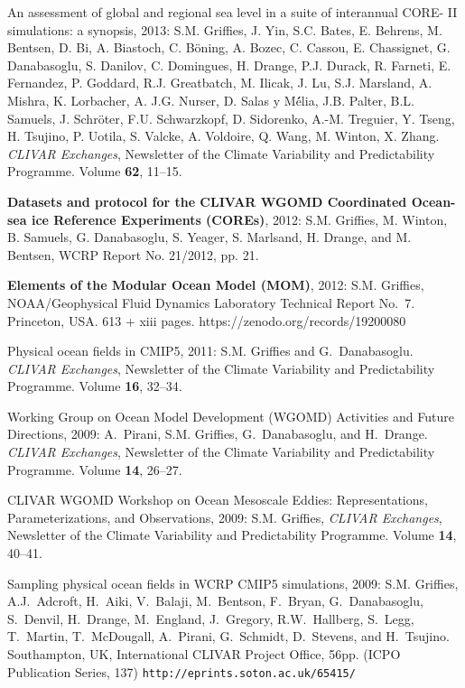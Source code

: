 \begin{etaremune}
\item An assessment of global and regional sea level in a suite of interannual CORE- II simulations: a synopsis, 2013:  S.M. Grif\/f\/ies, J. Yin, S.C. Bates, E. Behrens, M.  Bentsen, D. Bi, A. Biastoch, C. B\"{o}ning, A. Bozec, C. Cassou, E. Chassignet, G. Danabasoglu, S. Danilov, C. Domingues, H. Drange, P.J. Durack, R. Farneti, E. Fernandez, P. Goddard, R.J. Greatbatch, M. Ilicak, J. Lu, S.J. Marsland, A. Mishra, K. Lorbacher, A. J.G. Nurser, D. Salas y M\'{é}lia, J.B. Palter, B.L. Samuels, J. Schr\"{o}ter, F.U. Schwarzkopf, D. Sidorenko, A.-M. Treguier, Y. Tseng, H. Tsujino, P.  Uotila, S. Valcke, A. Voldoire, Q. Wang, M. Winton, X. Zhang. {\em CLIVAR Exchanges}, Newsletter of the Climate Variability and Predictability Programme. Volume {\bf 62}, 11--15.

\item {\bf Datasets and protocol for the CLIVAR WGOMD Coordinated Ocean-sea ice Reference Experiments (COREs)}, 2012: S.M. Grif\/f\/ies, M. Winton, B. Samuels, G. Danabasoglu, S. Yeager, S. Marlsand, H.  Drange, and M. Bentsen, WCRP Report No. 21/2012, pp. 21.

\item {\bf Elements of the Modular Ocean Model (MOM)}, 2012: S.M. Grif\/f\/ies, NOAA/Geophysical Fluid Dynamics Laboratory Technical Report No.\ 7. Princeton, USA.  613 + xiii pages. 
https://zenodo.org/records/19200080

\item Physical ocean fields in CMIP5, 2011:  S.M. Grif\/f\/ies and G.\ Danabasoglu. {\em CLIVAR Exchanges}, Newsletter of the Climate Variability and Predictability Programme.  Volume {\bf 16}, 32--34.

\item Working Group on Ocean Model Development (WGOMD) Activities and Future Directions, 2009: A.\ Pirani, S.M. Grif\/f\/ies, G.\ Danabasoglu, and H.\ Drange.  {\em CLIVAR Exchanges}, Newsletter of the Climate Variability and Predictability Programme.  Volume {\bf 14}, 26--27.

\item CLIVAR WGOMD Workshop on Ocean Mesoscale Eddies:
  Representations, Parameterizations, and Observations, 2009: S.M. Grif\/f\/ies, {\em CLIVAR Exchanges}, Newsletter of the Climate Variability and Predictability Programme.  Volume {\bf 14}, 40--41.

\item Sampling physical ocean fields in WCRP CMIP5 simulations, 2009: S.M. Grif\/f\/ies, A.J.\ Adcroft, H.\ Aiki, V.\ Balaji, M.\ Bentson, F.\ Bryan, G.\ Danabasoglu, S.\ Denvil, H.\ Drange, M.\ England, J.\ Gregory, R.W.\ Hallberg, S.\ Legg, T.\ Martin, T.\ McDougall, A.\ Pirani, G.\ Schmidt, D.\ Stevens, and H.\ Tsujino. Southampton, UK, International CLIVAR Project Office, 56pp. (ICPO
  Publication Series, 137) {\tt http://eprints.soton.ac.uk/65415/}


\end{etaremune}
